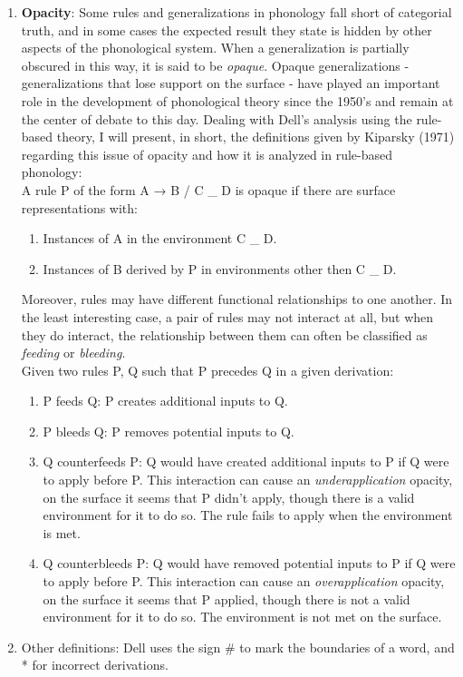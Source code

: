 \documentclass{article}
\begin{document}
\begin{enumerate}
  \item \textbf{Opacity}: Some rules and generalizations in phonology fall short of categorial truth, and in some cases the expected result they state is hidden by other aspects of the phonological system. When a generalization is partially obscured in this way,  it is said to be \textit{opaque}.  Opaque generalizations - generalizations that lose support on the surface - have played an important role in the development of phonological theory since the 1950’s and remain at the center of debate to this day.  Dealing with Dell's analysis using the rule-based theory, I will present, in short, the definitions given by Kiparsky (1971) regarding this issue of opacity and how it is analyzed in rule-based phonology:\\
A rule P of the form A → B / C \_ D is opaque if there are surface representations with:
\begin{enumerate}
  \item Instances of A in the environment C \_ D.
  \item Instances of B derived by P in environments other then C \_ D.
\end{enumerate}
Moreover, rules may have different functional relationships to one another. In the least interesting case, a pair of rules may not interact at all, but when they do interact, the relationship between them can often be classified as \textit{feeding} or \textit{bleeding}. \\
Given two rules P, Q such that P precedes Q in a given derivation:
\begin{enumerate}
  \item P feeds Q: P creates additional inputs to Q.
  \item P bleeds Q: P removes potential inputs to Q.
  \item Q counterfeeds P: Q would have created additional inputs to P if Q were to apply before P.  This interaction can cause an \textit{underapplication} opacity, on the surface it seems that P didn't apply, though there is a valid environment for it to do so.  The rule fails to apply when the environment is met.
  \item Q counterbleeds P: Q would have removed potential inputs to P if Q were to apply before P. This interaction can cause an \textit{overapplication} opacity, on the surface it seems that P applied, though there is not a valid environment for it to do so. The environment is not met on the surface.
\end{enumerate}

  \item Other definitions: Dell uses the sign \# to mark the boundaries of a word, and * for incorrect derivations.

\end{enumerate}
\end{document}
